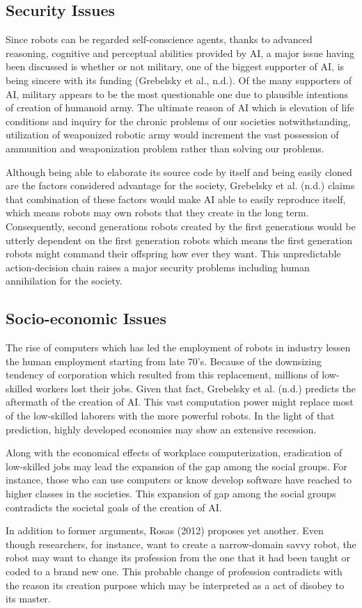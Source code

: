 \documentclass[man]{apa6}
\begin{document}
\subsection{Security Issues}
Since robots can be regarded self-conscience agents, thanks to advanced reasoning, cognitive and perceptual abilities provided by AI, a major issue having been discussed is whether or not military, one of the biggest supporter of AI, is being sincere with its funding (Grebelsky et al., n.d.). Of the many supporters of AI, military appears to be the most questionable one due to plausible intentions of creation of humanoid army. The ultimate reason of AI which is elevation of life conditions and inquiry for the chronic problems of our societies notwithstanding, utilization of weaponized robotic army would increment the vast possession of ammunition and weaponization problem rather than solving our problems.\par
Although being able to elaborate its source code by itself and being easily cloned are the factors considered advantage for the society, Grebelsky et al. (n.d.) claims that combination of these factors would make AI able to easily reproduce itself, which means robots may own robots that they create in the long term. Consequently, second generations robots created by the first generations would be utterly
dependent on the first generation robots which means the first generation robots might command their offspring how ever they want. This unpredictable action-decision chain raises a major security problems including human annihilation for the society. 
\subsection{Socio-economic Issues}
The rise of computers which has led the employment of robots in industry lessen the human employment starting from late 70's. Because of the downsizing tendency of corporation which resulted from this replacement, millions of low-skilled workers lost their jobs. Given that fact, Grebelsky et al. (n.d.) predicts the aftermath of the creation of AI. This vast computation power might replace most of the low-skilled laborers with the more powerful robots. In the light of that prediction, highly developed economies may show an extensive recession.\par
Along with the economical effects of workplace computerization, eradication of low-skilled jobs may lead the expansion of the gap among the social groups. For instance, those who can use computers or know develop software have reached to higher classes in the societies. This expansion of gap among the social groups contradicts the societal goals of the creation of AI.\par
In addition to former arguments, Rosas (2012) proposes yet another. Even though researchers, for instance, want to create a narrow-domain savvy robot, the robot may want to change its profession
from the one that it had been taught or coded to a brand new one. This probable change of profession contradicts with the reason its creation purpose which may be interpreted as a act of disobey to its master.
\end{document}
